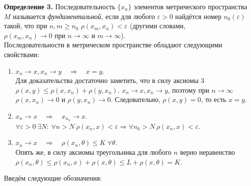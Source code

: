 \documentclass[12pt,a4paper, titlepage]{article}
\begin{document}
\textbf{Определение 3.} Последовательность $\lbrace x_n \rbrace$ элементов метрического пространства $M$ называется \textit{фундаментальной}, если для любого $\varepsilon > 0$ найдётся номер $n_0(\varepsilon)$ такой, что при $n, m \geqslant n_0$  $\rho (x_m, x_n) < \varepsilon$ (другими словами, $\rho(x_m, x_n) \to 0 \mbox{ при } n \to\infty \mbox{ и } m\to\infty$).\\

Последовательности в метрическом пространстве обладают следующими свойствами: 
\begin{enumerate}
\item
$x_n \to x, x_n \to y \quad \Rightarrow \quad x = y$.\\
Для доказательства достаточно заметить, что в силу аксиомы 3 $\rho(x, y) \leqslant \rho(x, x_n) + \rho(y, x_n)$. $x_n \to x, x_n \to y$, поэтому при $n \to \infty$ $\rho(x, x_n) \to 0$ и $\rho(y, x_n) \to 0$. Следовательно, $\rho(x, y) = 0$, то есть $x = y$.

\item
$x_n \to x \quad \Rightarrow \quad x_{n_k} \to x$.\\

$\forall \varepsilon>0 ~\exists N: ~\forall n>N ~\rho(x_n, x) < \varepsilon \Rightarrow \forall n_k>N ~\rho(x_n, x) < \varepsilon$.

\item $x_n \to x \quad \Rightarrow \quad \rho(x_n, \theta) \leqslant K \; \forall \theta$.\\
Опять же, в силу аксиомы треугольника для любого $n$ верно неравенство $\rho(x_n, \theta) \leqslant \rho (x_n, x) + \rho (x, \theta) \leqslant L + \rho(x, \theta) = K$.
\end{enumerate}

Введём следующие обозначения:
\end{document}
